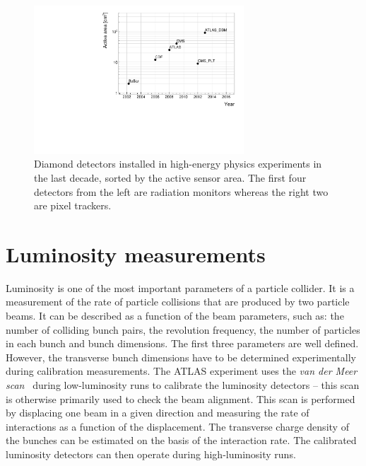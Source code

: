 \begin{figure}[!t]
\centering
\includegraphics[width=0.7\textwidth]{../scripts/04_charge_monitoring/plots/detArea}
\caption{Diamond detectors installed in high-energy physics experiments in the last decade, sorted by the active sensor area. The first four detectors from the left are radiation monitors whereas the right two are pixel trackers.}
\label{fig:areavsyear}
\end{figure}

\section{Luminosity measurements}
\label{sec:lumi}
Luminosity is one of the most important parameters of a particle collider. It is a measurement of the rate of particle collisions that are produced by two particle beams. It can be described as a function of the beam parameters, such as: the number of colliding bunch pairs, the revolution frequency, the number of particles in each bunch and bunch dimensions. The first three parameters are well defined. However, the transverse bunch dimensions have to be determined experimentally during calibration measurements. The ATLAS experiment uses the \emph{van der Meer scan}~\cite{ATLAS-CONF-2010-102} during low-luminosity runs to calibrate the luminosity detectors -- this scan is otherwise primarily used to check the beam alignment. This scan is performed by displacing one beam in a given direction and measuring the rate of interactions as a function of the displacement. The transverse charge density of the bunches can be estimated on the basis of the interaction rate. The calibrated luminosity detectors can then operate during high-luminosity runs.

